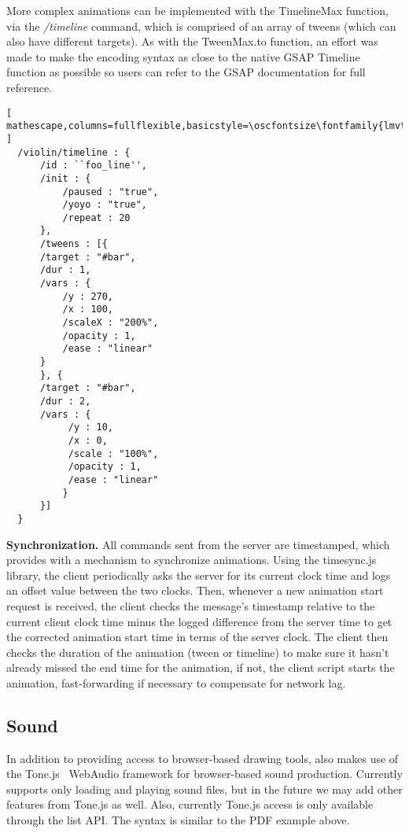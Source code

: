 More complex animations can be implemented with the TimelineMax function, via the \drawsocket \textit{/timeline} command, which is comprised of an array of tweens (which can also have different targets).
As with the TweenMax.to function, an effort was made to make the encoding syntax as close to the native GSAP Timeline function as possible so users can refer to the GSAP documentation for full reference.

\begin{minipage}{\linewidth}
\begin{lstlisting}[ mathescape,columns=fullflexible,basicstyle=\oscfontsize\fontfamily{lmvtt}\selectfont ]
  /violin/timeline : {
      /id : ``foo_line'',
      /init : {
          /paused : "true",
          /yoyo : "true",
          /repeat : 20
      },
      /tweens : [{
	  /target : "#bar",
	  /dur : 1,
	  /vars : {
	      /y : 270,
	      /x : 100,
	      /scaleX : "200%",
	      /opacity : 1,
	      /ease : "linear"
	  }
      }, {
	  /target : "#bar",
	  /dur : 2,
	  /vars : {
	       /y : 10,
	       /x : 0,
	       /scale : "100%",
	       /opacity : 1,
	       /ease : "linear"
      	  }
      }]
  }
\end{lstlisting}
\end{minipage}

\medskip
\noindent
\textbf{Synchronization.} 
All commands sent from the server are timestamped, which provides \drawsocket with a mechanism to synchronize animations.
Using the timesync.js library, the client periodically asks the server for its current clock time and logs an offset value between the two clocks.
Then, whenever a new animation start request is received, the client checks the message's timestamp relative to the current client clock time minus the logged difference from the server time to get the corrected animation start time in terms of the server clock.
The client then checks the duration of the animation (tween or timeline) to make sure it hasn't already missed the end time for the animation, if not, the client script starts the animation, fast-forwarding if necessary to compensate for network lag.


\subsection{Sound}\label{sec:sound}
In addition to providing access to browser-based drawing tools, \drawsocket also makes use of the Tone.js~\cite{mann2015interactive} WebAudio framework for browser-based sound production.
Currently \drawsocket supports only loading and playing sound files, but in the future we may add other features from Tone.js as well.
Also, currently Tone.js access is only available through the list API. 
The syntax is similar to the PDF example above. 



